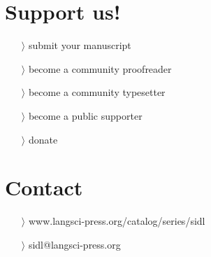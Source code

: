\documentclass[
notumble,
nofoldmark,
]{leaflet}
\begin{document}
{{    \section{\color{LIGHTGRAY} \sffamily \Large Support us!}
	\begin{itemize}
	  \item[$\rangle$] submit your manuscript 
	  \item[$\rangle$] become a community proofreader 
	  \item[$\rangle$] become a community typesetter
	  \item[$\rangle$] become a public supporter
	  \item[$\rangle$] donate
	\end{itemize} 
    \section{\color{LIGHTGRAY} \sffamily \Large Contact} 
	\begin{itemize}
	  \item[$\rangle$] \sffamily www.langsci-press.org/catalog/series/sidl
	  \item[$\rangle$]\sffamily  sidl@langsci-press.org 
	\end{itemize} 
  }
}

\usebox{\pageone}

\newpage

\usebox{\pagetwo}

\newpage

\usebox{\pagetwo}

\newpage

\usebox{\pagetwo}

\newpage

\usebox{\pageone}

\newpage

\usebox{\pageone}
 

\loggingall
\end{document}
